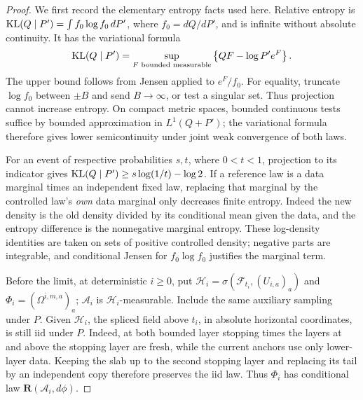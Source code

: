 \begin{proof}
We first record the elementary entropy facts used here. Relative
entropy is \({\rm KL}(Q\mid P')=\int f_0\log f_0\,dP'\), where
\(f_0=dQ/dP'\), and is infinite without absolute continuity. It has
the variational formula
\[
{\rm KL}(Q\mid P')
=\sup_{F\text{ bounded measurable}}
\left\{QF-\log P'e^F\right\}.
\]
The upper bound follows from Jensen applied to \(e^F/f_0\).
For equality, truncate \(\log f_0\) between \(\pm B\) and send
\(B\to\infty\), or test a singular set. Thus projection cannot
increase entropy. On compact metric spaces, bounded continuous tests
suffice by bounded approximation in \(L^1(Q+P')\); the variational
formula therefore gives lower semicontinuity under joint weak
convergence of both laws.

For an event of respective probabilities \(s,t\), where \(0<t<1\),
projection to its indicator gives
\({\rm KL}(Q\mid P')\ge s\log(1/t)-\log2\).
If a reference law is a data marginal times an independent fixed law,
replacing that marginal by the controlled law's \emph{own} data
marginal only decreases finite entropy. Indeed the new density is
the old density divided by its conditional mean given the data, and
the entropy difference is the nonnegative marginal entropy. These
log-density identities are taken on sets of positive controlled
density; negative parts are integrable, and conditional Jensen for
\(f_0\log f_0\) justifies the marginal term.

Before the limit, at deterministic \(i\ge0\), put
\(\mathcal H_i=\sigma(\mathcal F_{t_i},(U_{i,a})_a)\) and
\(\Phi_i=(\Omega^{i,m,a})_a\); \(\mathcal A_i\) is
\(\mathcal H_i\)-measurable. Include the same auxiliary sampling under
\(P\). Given \(\mathcal H_i\), the spliced field above \(t_i\), in
absolute horizontal coordinates, is still iid under \(P\). Indeed, at
both bounded layer stopping times the layers at and above the stopping
layer are fresh, while the current anchors use only lower-layer data.
Keeping the slab up to the second stopping layer and replacing its tail
by an independent copy therefore preserves the iid law. Thus \(\Phi_i\)
has conditional law \(\mathbf R(\mathcal A_i,d\phi)\).


\end{proof}

